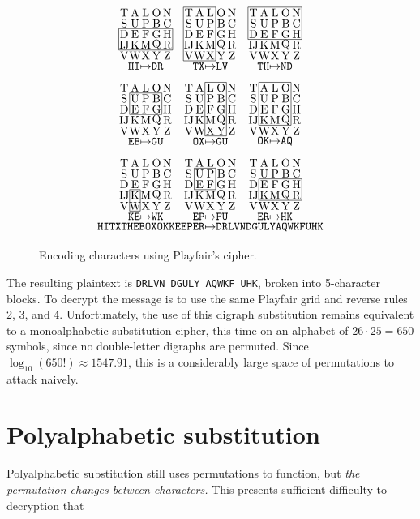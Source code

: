 \documentclass[m3380-lec-main.tex]{subfiles}
\begin{document}
\begin{figure}[hbt]
{\tiny\[
\begin{tikzpicture}[scale=1/3]
\draw \foreach \s in {0,6,12}{
    \foreach \t in {14, 7, 0}{
        \foreach \y/\x/\z in {4/0/T,  4/1/A,  4/2/L,  4/3/O,  4/4/N,  3/0/S,  3/1/U,  3/2/P,  3/3/B,  3/4/C,  2/0/D,  2/1/E,  2/2/F,  2/3/G,  2/4/H,  1/0/IJ,  1/1/K,  1/2/M,  1/3/Q,  1/4/R,  0/0/V,  0/1/W,  0/2/X,  0/3/Y,  0/4/Z}{
            (\s+\x+.5,\t+\y+.5) node {\z}
}}};
\draw
    (0,14 + 1) rectangle (5,14 + 3)
    (2.5,13.5) node {\texttt{HI}$\mapsto$\texttt{DR}}
    ( 6 + 0,14 + 0) rectangle ( 6 + 3,14 + 5)
    (8.5,13.5) node {\texttt{TX}$\mapsto$\texttt{LV}}
    (12 + 0,14 + 2) rectangle (12 + 5,14 + 5)
    (14.5,13.5) node {\texttt{TH}$\mapsto$\texttt{ND}}
    (1, 7 + 2) rectangle (4, 7 + 4)
    (2.5,6.5) node {\texttt{EB}$\mapsto$\texttt{GU}}
    ( 6 + 2, 7 + 0) rectangle ( 6 + 4, 7 + 5)
    (8.5,6.5) node {\texttt{OX}$\mapsto$\texttt{GU}}
    (12 + 1, 7 + 1) rectangle (12 + 4, 7 + 5)
    (14.5,6.5) node {\texttt{OK}$\mapsto$\texttt{AQ}}
    (1,0) rectangle (2,2)
    (2.5,-0.5) node {\texttt{KE}$\mapsto$\texttt{WK}}
    ( 6 + 1,2) rectangle ( 6 + 3,4)
    (8.5,-0.5) node {\texttt{EP}$\mapsto$\texttt{FU}}
    (12 + 1,1) rectangle (12 + 5,3)
    (14.5,-0.5) node {\texttt{ER}$\mapsto$\texttt{HK}};

\draw (8.5,-1.5) node {\texttt{HITXTHEBOXOKKEEPER$\mapsto$DRLVNDGULYAQWKFUHK}};
\end{tikzpicture}
\]}
\caption{\label{fig:playfair_exmp}Encoding characters using Playfair's cipher.}
\end{figure}

The resulting plaintext is \verb|DRLVN DGULY AQWKF UHK|, broken into 5-character blocks. To decrypt the message is to use the same Playfair grid and reverse rules 2, 3, and 4. Unfortunately, the use of this digraph substitution remains equivalent to a monoalphabetic substitution cipher, this time on an alphabet of $26\cdot 25 = 650$ symbols, since no double-letter digraphs are permuted. Since $\log_{10}(650!)\approx 1547.91$, this is a considerably large space of permutations to attack naively.

\section{Polyalphabetic substitution}
Polyalphabetic substitution still uses permutations to function, but \emph{the permutation changes between characters.} This presents sufficient difficulty to decryption that 
\end{document}
